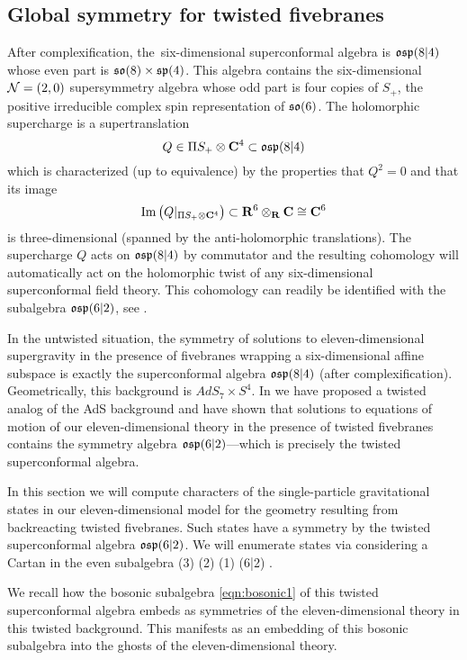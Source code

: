 \documentclass[11pt]{amsart}
\begin{document}
\subsection{Global symmetry for twisted fivebranes}

After complexification, the~six-dimensional superconformal algebra is $\mathfrak{osp}(8|4)$ whose even part is $\mathfrak{so}(8) \times \mathfrak{sp}(4)$. 
This algebra contains the six-dimensional $\mathcal N=(2,0)$ supersymmetry algebra whose odd part is four copies of $S_+$, the positive irreducible complex spin representation of $\mathfrak{so}(6)$.
The holomorphic supercharge is a supertranslation 
\[
Q \in \Pi S_+ \otimes \mathbf{C}^4 \subset \mathfrak{osp}(8|4)
\]
which is characterized (up to equivalence) by the properties that $Q^2 = 0$ and that its image
\[
{\rm Im}\left(Q|_{\Pi S_+ \otimes \mathbf{C}^4} \right) \subset \mathbf{R}^6 \otimes_{\mathbf{R}} \mathbf{C} \cong \mathbf{C}^6
\]
is three-dimensional (spanned by the anti-holomorphic translations). 
The supercharge $Q$ acts on $\mathfrak{osp}(8|4)$ by commutator and the resulting cohomology will automatically act on the holomorphic twist of any six-dimensional superconformal field theory. 
This cohomology can readily be identified with the subalgebra $\mathfrak{osp}(6|2)$, see \cite{SWe36}. 

In the untwisted situation, the symmetry of solutions to eleven-dimensional supergravity in the presence of fivebranes wrapping a six-dimensional affine subspace is exactly the superconformal algebra $\mathfrak{osp}(8|4)$ (after complexification). 
Geometrically, this background is $AdS_7 \times S^4$. 
In \cite{RSW} we have proposed a twisted analog of the AdS background and have shown that solutions to equations of motion of our eleven-dimensional theory in the presence of twisted fivebranes contains the symmetry algebra $\mathfrak{osp}(6|2)$---which is precisely the twisted superconformal algebra.

In this section we will compute characters of the single-particle gravitational states in our eleven-dimensional model for the geometry resulting from backreacting twisted fivebranes.
Such states have a symmetry by the twisted superconformal algebra $\mathfrak{osp}(6|2)$. 
We will enumerate states via considering a Cartan in the even subalgebra
\beqn\label{eqn:bosonic1}
(3) \times {}(2) \times {}(1) \subset {}(6|2) .
\eeqn



We recall how the bosonic subalgebra \eqref{eqn:bosonic1} of this twisted superconformal algebra embeds as symmetries of the eleven-dimensional theory in this twisted background. 
This manifests as an embedding of this bosonic subalgebra into the ghosts of the eleven-dimensional theory. 
\end{document}
